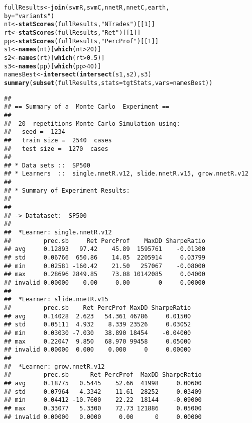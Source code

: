 \documentclass{article}\usepackage[]{graphicx}\usepackage[]{color}
\makeatletter
\newcommand{\hlnum}[1]{\textcolor[rgb]{0.686,0.059,0.569}{#1}}%
\newcommand{\hlstr}[1]{\textcolor[rgb]{0.192,0.494,0.8}{#1}}%
\newcommand{\hlopt}[1]{\textcolor[rgb]{0,0,0}{#1}}%
\newcommand{\hlstd}[1]{\textcolor[rgb]{0.345,0.345,0.345}{#1}}%
\newcommand{\hlkwb}[1]{\textcolor[rgb]{0.69,0.353,0.396}{#1}}%
\newcommand{\hlkwc}[1]{\textcolor[rgb]{0.333,0.667,0.333}{#1}}%
\newcommand{\hlkwd}[1]{\textcolor[rgb]{0.737,0.353,0.396}{\textbf{#1}}}%
\newenvironment{kframe}{%
 \def\at@end@of@kframe{}%
 \ifinner\ifhmode%
  \def\at@end@of@kframe{\end{minipage}}%
  \begin{minipage}{\columnwidth}%
 \fi\fi%
 \def\FrameCommand##1{\hskip\@totalleftmargin \hskip-\fboxsep
 \colorbox{shadecolor}{##1}\hskip-\fboxsep
     \hskip-\linewidth \hskip-\@totalleftmargin \hskip\columnwidth}%
 \MakeFramed {\advance\hsize-\width
   \@totalleftmargin\z@ \linewidth\hsize
   \@setminipage}}%
 {\par\unskip\endMakeFramed%
 \at@end@of@kframe}
\newenvironment{knitrout}{}{} %
\makeatother
\begin{document}
\begin{knitrout}
\color{fgcolor}\begin{kframe}
\begin{alltt}
\hlstd{fullResults} \hlkwb{<-} \hlkwd{join}\hlstd{(svmR, svmC, nnetR, nnetC, earth,}
                    \hlkwc{by} \hlstd{=} \hlstr{"variants"}\hlstd{)}
\hlstd{nt} \hlkwb{<-} \hlkwd{statScores}\hlstd{(fullResults,} \hlstr{"NTrades"}\hlstd{)[[}\hlnum{1}\hlstd{]]}
\hlstd{rt} \hlkwb{<-} \hlkwd{statScores}\hlstd{(fullResults,} \hlstr{"Ret"}\hlstd{)[[}\hlnum{1}\hlstd{]]}
\hlstd{pp} \hlkwb{<-} \hlkwd{statScores}\hlstd{(fullResults,} \hlstr{"PercProf"}\hlstd{)[[}\hlnum{1}\hlstd{]]}
\hlstd{s1} \hlkwb{<-} \hlkwd{names}\hlstd{(nt)[}\hlkwd{which}\hlstd{(nt} \hlopt{>} \hlnum{20}\hlstd{)]}
\hlstd{s2} \hlkwb{<-} \hlkwd{names}\hlstd{(rt)[}\hlkwd{which}\hlstd{(rt} \hlopt{>} \hlnum{0.5}\hlstd{)]}
\hlstd{s3} \hlkwb{<-} \hlkwd{names}\hlstd{(pp)[}\hlkwd{which}\hlstd{(pp} \hlopt{>} \hlnum{40}\hlstd{)]}
\hlstd{namesBest} \hlkwb{<-} \hlkwd{intersect}\hlstd{(}\hlkwd{intersect}\hlstd{(s1, s2), s3)}
\hlkwd{summary}\hlstd{(}\hlkwd{subset}\hlstd{(fullResults,} \hlkwc{stats} \hlstd{= tgtStats,} \hlkwc{vars} \hlstd{= namesBest))}
\end{alltt}
\begin{verbatim}
## 
## == Summary of a  Monte Carlo  Experiment ==
## 
##  20  repetitions Monte Carlo Simulation using: 
## 	 seed =  1234 
## 	 train size =  2540  cases 
## 	 test size =  1270  cases 
## 
## * Data sets ::  SP500
## * Learners  ::  single.nnetR.v12, slide.nnetR.v15, grow.nnetR.v12
## 
## * Summary of Experiment Results:
## 
## 
## -> Datataset:  SP500 
## 
## 	*Learner: single.nnetR.v12 
##         prec.sb     Ret PercProf    MaxDD SharpeRatio
## avg     0.12893   97.42    45.89  1595761    -0.01300
## std     0.06766  650.86    14.05  2205914     0.03799
## min     0.02581 -160.42    21.50   257067    -0.08000
## max     0.28696 2849.85    73.08 10142085     0.04000
## invalid 0.00000    0.00     0.00        0     0.00000
## 
## 	*Learner: slide.nnetR.v15 
##         prec.sb    Ret PercProf MaxDD SharpeRatio
## avg     0.14028  2.623   54.361 46786     0.01500
## std     0.05111  4.932    8.339 23526     0.03052
## min     0.03030 -7.030   38.890 18454    -0.04000
## max     0.22047  9.850   68.970 99458     0.05000
## invalid 0.00000  0.000    0.000     0     0.00000
## 
## 	*Learner: grow.nnetR.v12 
##         prec.sb      Ret PercProf  MaxDD SharpeRatio
## avg     0.18775   0.5445    52.66  41998     0.00600
## std     0.07964   4.3342    11.61  28252     0.03409
## min     0.04412 -10.7600    22.22  18144    -0.09000
## max     0.33077   5.3300    72.73 121886     0.05000
## invalid 0.00000   0.0000     0.00      0     0.00000
\end{verbatim}
\end{kframe}
\end{knitrout}
\end{document}
